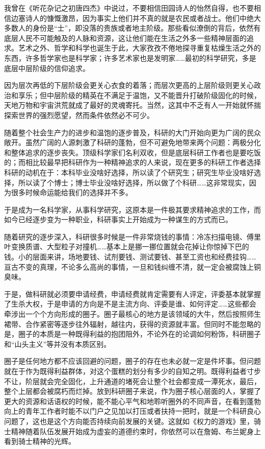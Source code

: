 \documentclass[]{book}
\begin{document}
我曾在《听花杂记之初唐四杰》中说过，不要相信田园诗人的怡然自得，也不要相信边塞诗人的慷慨激昂，因为事实上他们并不真的就是农民或者战士。他们中绝大多数人的身份是``士''，即没落的贵族或者地主阶级。那些看似潦倒的背后，依然有底层人民不可能触及的人脉和资源，这让他们能在生活之外多一些精神层面的追求。艺术之外、哲学和科学也诞生于此，大家孜孜不倦地探寻重复枯燥生活之外的东西，许多哲学家也是科学家；许多艺术家也是发明家\ldots{}\ldots{}最初的科学研究，多是底层中层阶级的信仰追求。

因为层次再低的下层阶级会更关心衣食的着落；而层次更高的上层阶级则更关心政治和享乐；但中层阶级的精英在不满足于温饱，又不能晋升打破阶级固化的时候，天地万物和宇宙洪荒就成了最好的灵魂寄托。当然，这其中不乏有人一开始就怀揣探索世界的强烈愿望，然而条件依然必不可少。

随着整个社会生产力的进步和温饱的逐步普及，科研的大门开始向更为广阔的民众敞开。虽然广阔的人源刺激了科研的蓬勃，但不可避免地带来两个问题：两极分化和整体追求的逐步丧失。顶级科学家们名利双收，但是底层科研工作者也是要吃饭的；而相比较最早把科研作为一种精神追求的人来说，现在更多的科研工作者选择科研的动机在于：本科毕业没啥好选择，所以读了个研究生；研究生毕业没啥好选择，所以读了个博士；博士毕业没啥好选择，所以做了个科研\ldots{}\ldots{}这非常现实，因为很多时候命运能给我们的选择并不多。

于是成为一名科学家，从事科学研究，这原本是一件极其要求精神追求的工作，而如今已经逐步变为一种职业，科研事实上开始成为一种谋生的方式而已。

随着研究的逐步深入，科研很多时候是一件非常烧钱的事情：冷冻扫描电镜、傅里叶变换质谱、大型粒子对撞机\ldots{}\ldots{}基本上是挪一挪位置就会花掉让你惊掉下巴的钱。小的层面来讲，场地要钱、试剂要钱、测试要钱、甚至工资也和经费挂钩\ldots{}\ldots{}亘古不变的真理，不论多么高尚的事情，一旦和钱纠缠不清，就一定会被腐蚀上铜臭味。

于是，做科研就必须要申请经费，申请经费就肯定需要有人评定，评委基本就掌握了生杀大权，于是申请的方向是不是主流方向、评委是谁、如何评定\ldots{}\ldots{}这些都会牵涉出一个个方向形成的圈子。圈子最核心的地方是该领域的大牛，然后按照师生裙带、合作紧密等逐步往外辐射，越往内，获得的资源就丰富。但同时不能忽略的是，圈子的本质是一种既得利益的抱团阻外，不论外在的论调如何粉饰，科研圈子和``山头主义''等并没有本质区别。

圈子是任何地方都不应该回避的问题，圈子的存在也未必就一定是件坏事。但问题就在于作为既得利益群体，对这个蛋糕的划分有多少的自知之明。既得利益者寸步不让，阶层就会完全固化，上升通道的堵死会让整个社会都变成一潭死水，最后，整个上层都会被腐朽而烂掉。放到科研圈子来说，作为圈子核心层面的人，掌握了更大的资源和话语权的时候，能不能心平气和地聆听圈外的不同声音，在看到蓬勃向上的青年工作者时能不以门户之见加以打压或者扶持一把时，就是一个科研良心问题了，这也是这个方向能否持续向前发展的关键。这就如《权力的游戏》里，骑士精神随着队伍发展开始成为虚妄的道德约束时，你依然可以在詹姆、布兰妮身上看到骑士精神的光辉。
\end{document}
